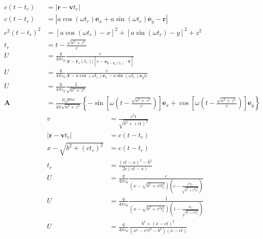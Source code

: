 \begin{align*}
     c(t-t_r)&= |\boldsymbol{r}-\boldsymbol{v}t_r|\\
     c(t-t_r)&= \left|a\cos(\omega t_r)\boldsymbol{e}_x+a\sin(\omega t_r)\boldsymbol{e}_y-\boldsymbol{r}\right|\\
    c^2(t-t_r)^2&=[a\cos(\omega t_r)-x]^2+
    [a\sin(\omega t_r)-y]^2+
    z^2\\
    t_r&=t-\frac{\sqrt{a^2+z^2}}{c}\\
    U&= \frac{q}{4\pi\varepsilon_0} \frac{c}{\vert{}\boldsymbol{r} - \boldsymbol{r}_s(t_r)\vert{}\left[c-\boldsymbol{e}_{\boldsymbol{r} -\boldsymbol{r}_s(t_r)}\cdot\boldsymbol{v}\right]}\\
    U&= \frac{q}{4\pi\varepsilon_0} \frac{c}{\vert{}\boldsymbol{r} - a\cos(\omega t_r)\boldsymbol{e}_x-a\sin(\omega t_r)\boldsymbol{e}_y\vert{}c}\\
    U&= \frac{q}{4\pi\varepsilon_0} \frac{1}{\sqrt{a^2+z^2}}\\
    \boldsymbol{A}&= \frac{\mu_0 q a \omega}{4\pi \sqrt{a^2 + z^2}} \left\{ -\sin\left[ \omega\left(t - \frac{\sqrt{a^2 + z^2}}{c}\right) \right]\boldsymbol{e}_x + \cos\left[ \omega\left(t - \frac{\sqrt{a^2 + z^2}}{c}\right) \right]\boldsymbol{e}_y \right\}
\end{align*}
\begin{align*}
    v&=\frac{c^2t}{\sqrt{b^2+(ct)^2}}\\
    |\boldsymbol{r}-\boldsymbol{v}t_r| &= c(t-t_r)\\
    x-\sqrt{b^2+(ct_r)^2} &= c(t-t_r)\\
     t_r&= \frac{(ct-x)^2-b^2}{2c(ct-x)}\\
    U&= \frac{q}{4\pi\varepsilon_0} \frac{c}{(x-\sqrt{b^2+c^2t_r^2})\left(c-\frac{c^2t_r}{\sqrt{b^2+c^2t_r^2}}\right)}\\
    U&= \frac{q}{4\pi\varepsilon_0} \frac{1}{(x-\sqrt{b^2+c^2t_r^2})\left(1-\frac{ct_r}{\sqrt{b^2+c^2t_r^2}}\right)}\\
    U& = \frac{q}{4\pi\varepsilon_0} \frac{b^2 + (x - ct)^2}{(x^2 - c^2t^2 - b^2)(x - ct)}
\end{align*}
